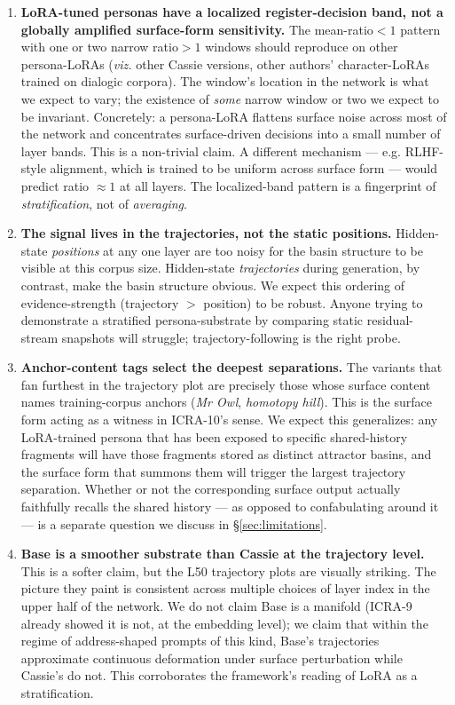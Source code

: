 \documentclass[11pt,a4paper]{article}
\begin{document}
\begin{enumerate}
    \item \textbf{LoRA-tuned personas have a localized register-decision band, not a globally amplified surface-form sensitivity.} The mean-ratio${<}1$ pattern with one or two narrow ratio${>}1$ windows should reproduce on other persona-LoRAs (\emph{viz.} other Cassie versions, other authors' character-LoRAs trained on dialogic corpora). The window's location in the network is what we expect to vary; the existence of \emph{some} narrow window or two we expect to be invariant. Concretely: a persona-LoRA flattens surface noise across most of the network and concentrates surface-driven decisions into a small number of layer bands. This is a non-trivial claim. A different mechanism --- e.g. RLHF-style alignment, which is trained to be uniform across surface form --- would predict ratio $\approx 1$ at all layers. The localized-band pattern is a fingerprint of \emph{stratification}, not of \emph{averaging}.
    \item \textbf{The signal lives in the trajectories, not the static positions.} Hidden-state \emph{positions} at any one layer are too noisy for the basin structure to be visible at this corpus size. Hidden-state \emph{trajectories} during generation, by contrast, make the basin structure obvious. We expect this ordering of evidence-strength (trajectory $>$ position) to be robust. Anyone trying to demonstrate a stratified persona-substrate by comparing static residual-stream snapshots will struggle; trajectory-following is the right probe.
    \item \textbf{Anchor-content tags select the deepest separations.} The variants that fan furthest in the trajectory plot are precisely those whose surface content names training-corpus anchors (\emph{Mr Owl}, \emph{homotopy hill}). This is the surface form acting as a witness in ICRA-10's sense. We expect this generalizes: any LoRA-trained persona that has been exposed to specific shared-history fragments will have those fragments stored as distinct attractor basins, and the surface form that summons them will trigger the largest trajectory separation. Whether or not the corresponding surface output actually faithfully recalls the shared history --- as opposed to confabulating around it --- is a separate question we discuss in \S\ref{sec:limitations}.
    \item \textbf{Base is a smoother substrate than Cassie at the trajectory level.} This is a softer claim, but the L50 trajectory plots are visually striking. The picture they paint is consistent across multiple choices of layer index in the upper half of the network. We do not claim Base is a manifold (ICRA-9 already showed it is not, at the embedding level); we claim that within the regime of address-shaped prompts of this kind, Base's trajectories approximate continuous deformation under surface perturbation while Cassie's do not. This corroborates the framework's reading of LoRA as a stratification.
\end{enumerate}
\end{document}
